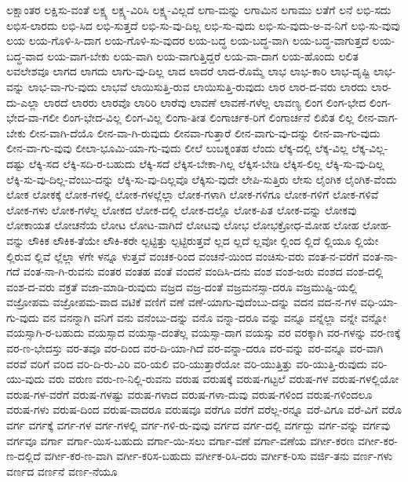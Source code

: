 {ಲಕ್ಷಾಂತರ
ಲಕ್ಷಿಸು-ವಂತೆ
ಲಕ್ಷ್ಯ
ಲಕ್ಷ್ಯ-ವಿರಿಸಿ
ಲಕ್ಷ್ಯ-ವಿಲ್ಲದೆ
ಲಗಾ-ಮನ್ನು
ಲಗಾಮಿನ
ಲಗಾಮು
ಲತೆಗೆ
ಲನೆ
ಲಭಿ-ಸದು
ಲಭಿಸ-ಲಾರದು
ಲಭಿ-ಸಿದ
ಲಭಿ-ಸುತ್ತದೆ
ಲಭಿ-ಸು-ವು-ದಿಲ್ಲ
ಲಭಿ-ಸು-ವುದು
ಲಭಿ-ಸು-ವುದು-ಅ-ವ-ನಿಗೆ
ಲಭಿ-ಸು-ವುವು
ಲಯ
ಲಯ-ಗೊಳಿ-ಸಿ-ದಾಗ
ಲಯ-ಗೊಳಿ-ಸು-ವುದರ
ಲಯ-ಬದ್ಧ
ಲಯ-ಬದ್ಧ-ವಾಗಿ
ಲಯ-ಬದ್ಧ-ವಾಗುತ್ತದೆ
ಲಯ-ಬದ್ಧ-ವಾದ
ಲಯ-ವಾಗ-ಬೇಕು
ಲಯ-ವಾಗಿ
ಲಯ-ವಾಗುತ್ತಿದ್ದರೆ
ಲಯ-ವಾ-ದಾಗ
ಲಯ-ಹೊಂದು
ಲಲಿತ
ಲವಲೇಶವೂ
ಲಾಗದ
ಲಾಗದು
ಲಾಗು-ವು-ದಿಲ್ಲ
ಲಾದ
ಲಾದರೆ
ಲಾದ-ರೊಮ್ಮೆ
ಲಾಭ
ಲಾಭ-ಕಾರಿ
ಲಾಭ-ದೃಷ್ಟಿ
ಲಾಭ-ವನ್ನು
ಲಾಭ-ವಾ-ಗು-ವುದು
ಲಾಭವೆ
ಲಾಯಿಸುತ್ತಿ-ರುವ
ಲಾಯಿಸುತ್ತಿ-ರುವುದು
ಲಾರ
ಲಾರ-ದ-ವರು
ಲಾರದು
ಲಾರ-ದು-ಎಲ್ಲಾ
ಲಾರದೆ
ಲಾರರು
ಲಾರವೊ
ಲಾರಿರಿ
ಲಾರೆವು
ಲಾವಣೆ
ಲಾವಣೆ-ಗಳೆಲ್ಲ
ಲಾವಣ್ಯ
ಲಿಂಗ
ಲಿಂಗ-ಭೇದ
ಲಿಂಗ-ಭೇದ-ವಾ-ಗಲೀ
ಲಿಂಗ-ಭೇದ-ವಿಲ್ಲ
ಲಿಂಗ-ವಿಲ್ಲ
ಲಿಂಗಾ-ತೀತ
ಲಿಂಗಾರ್ಚಕ-ರಿಗೆ
ಲಿಂಗಾರ್ಚನೆ
ಲಿಖಿತ
ಲಿಲ್ಲ
ಲೀನ-ವಾಗ-ಬೇಕು
ಲೀನ-ವಾಗಿ-ದೆಯೊ
ಲೀನ-ವಾ-ಗಿ-ರುವುದು
ಲೀನವಾ-ಗುತ್ತಾರೆ
ಲೀನ-ವಾಗು-ವು-ದನ್ನು
ಲೀನ-ವಾ-ಗು-ವುದು
ಲೀನ-ವಾ-ಗು-ವುವು
ಲೀಲಾ-ಭೂಮಿ-ಯಾ-ಗು-ವುದು
ಲೀಲೆ
ಲುಬಕ್ನಂತಹ
ಲೆಂದು
ಲೆಕ್ಕ-ದಲ್ಲಿ
ಲೆಕ್ಕ-ವಿಲ್ಲ
ಲೆಕ್ಕ-ವಿಲ್ಲ-ದಷ್ಟು
ಲೆಕ್ಕಿ-ಸದ
ಲೆಕ್ಕಿ-ಸದಿ-ರ-ಬಹುದು
ಲೆಕ್ಕಿ-ಸದೆ
ಲೆಕ್ಕಿಸ-ಬೇಕಾ-ಗಿಲ್ಲ
ಲೆಕ್ಕಿಸ-ಬೇಡಿ
ಲೆಕ್ಕಿಸ-ಲಿಲ್ಲ
ಲೆಕ್ಕಿ-ಸು-ವು-ದಿಲ್ಲ
ಲೆಕ್ಕಿ-ಸು-ವು-ದಿಲ್ಲ-ವೆಂಬು-ದನ್ನು
ಲೆಕ್ಕಿ-ಸು-ವು-ದಿಲ್ಲವೊ
ಲೆಕ್ಕಿಸು-ವುದೇ
ಲೇಪಿ-ಸುತ್ತಿರು
ಲೇಸು
ಲೈಂಗಿಕ
ಲೈಂಗಿಕ-ವೆಂದು
ಲೋಕ
ಲೋಕಕ್ಕೆ
ಲೋಕ-ಗಳಲ್ಲಿ
ಲೋಕ-ಗಳಲ್ಲೆಲ್ಲಾ
ಲೋಕ-ಗಳಾಗಿ
ಲೋಕ-ಗಳಿಗೂ
ಲೋಕ-ಗಳಿಗೆ
ಲೋಕ-ಗಳಿವೆ
ಲೋಕ-ಗಳು
ಲೋಕ-ಗಳೆಲ್ಲ
ಲೋಕದ
ಲೋಕ-ದಲ್ಲಿ
ಲೋಕ-ದಲ್ಲೊ
ಲೋಕ-ಪಿತ
ಲೋಕ-ವನ್ನು
ಲೋಕವು
ಲೋಕಾಯತ
ಲೋಚನೆಯ
ಲೋಟ
ಲೋಟ-ವಾಗಿದೆ
ಲೋಟವು
ಲೋಭ
ಲೋಭಕ್ರೋಧ-ಮೋಹ
ಲೋಹ
ಲೋಹ-ವನ್ನು
ಲೌಕಿಕ
ಲೌಕಿಕ-ತೆಯೇ
ಲೌಕಿ-ಕರೇ
ಲ್ಪಟ್ಟಿತ್ತು
ಲ್ಪಟ್ಟಿರುತ್ತವೆ
ಲ್ಲದ
ಲ್ಲದೆ
ಲ್ಲವೋ
ಲ್ಲಿಂದ
ಲ್ಲಿದೆ
ಲ್ಲಿಯೂ
ಲ್ಲಿಯೇ
ಲ್ಲಿರುವ
ಲ್ಲಿವೆ
ಲ್ಲೆಲ್ಲಾ
ಳಗೇ
ಳನ್ನೂ
ಳುತ್ತವೆ
ವಂಚಕ-ರಿಂದ
ವಂಚನೆ-ಯಿಂದ
ವಂಚಿಸು-ವರು
ವಂತ-ನ-ವರೆಗೆ
ವಂತ-ನಾ-ಗದೆ
ವಂತ-ನಾ-ಗಿ-ರುವನು
ವಂತರ
ವಂತಹ
ವಂತೆ
ವಂದನೆ
ವಂದಿಸಿ-ದನು
ವಂಶ
ವಂಶ-ಜರು
ವಂಶದ
ವಂಶ-ದಲ್ಲಿ
ವಂಶ-ದ-ವರು
ವಕ್ರತೆ
ವಜಾ-ಮಾಡಿ-ರುವುದು
ವಜ್ರದ
ವಜ್ರ-ದಂತೆ
ವಜ್ರಮನಸ್ಸಾ-ದರೂ
ವಜ್ರಮುಷ್ಟಿ-ಯಲ್ಲಿ
ವಜ್ರೋಪಮ
ವಜ್ರೋಪಮ-ವಾದ
ವಟಿಕೆ
ವಣಿಗೆ
ವಣೆ
ವಣೆ-ಯಾಗು-ವುದೆಂಬು-ದನ್ನು
ವದನ
ವದ-ನ-ಗಳ
ವಧಿ-ಯಾ-ಗು-ವುದು
ವನ
ವನನ್ನಾಗಿ
ವನಿಗೆ
ವನು
ವನೆಂಬು-ದನ್ನು
ವನೊ
ವನ್ನಾ-ದರೂ
ವನ್ನು
ವನ್ನೂ
ವನ್ನೆಲ್ಲಾ
ವನ್ನೇ
ವನ್ನೋ
ವಯಸ್ಸಾಗಿ-ರ-ಬಹುದು
ವಯಸ್ಸಾದ
ವಯಸ್ಸಾ-ದಂತೆಲ್ಲ
ವಯಸ್ಸಾ-ದಾಗ
ವಯಸ್ಸು
ವರ
ವರಕ್ಕಾಗಿ
ವರ-ಗಳನ್ನು
ವರ-ಣಕ್ಕೆ
ವರ-ಣ-ಭೇದಸ್ತು
ವರ-ತವೂ
ವರ-ದಿಂದ
ವರ-ದಿ-ಯಾ-ಗಿದೆ
ವರ-ವನ್ನಾ-ದರೂ
ವರ-ವನ್ನು
ವರ-ವನ್ನೂ
ವರ-ವಾಗಿ
ವರವೆ
ವರಿಗೆ
ವರಿದ
ವರಿ-ದಿ-ರು-ವಿರಿ
ವರಿ-ಯಲಿ
ವರಿ-ಯುತ್ತಾರೆಯೋ
ವರಿ-ಯುತ್ತಿತ್ತು
ವರಿ-ಯುತ್ತಿ-ರುವುದು
ವರಿ-ಯು-ವುದು
ವರು
ವರುಣ
ವರು-ಣ-ನಿಲ್ಲಿ-ರುವನು
ವರುಷ
ವರುಷಕ್ಕೆ
ವರುಷ-ಗಟ್ಟಲೆ
ವರುಷ-ಗಳ
ವರುಷ-ಗಳಲ್ಲಿಯೋ
ವರುಷ-ಗಳ-ವರೆಗೆ
ವರುಷ-ಗಳಷ್ಟು
ವರುಷ-ಗಳಾದ
ವರುಷ-ಗಳಾ-ದುವು
ವರುಷ-ಗಳಿಂದ
ವರುಷ-ಗಳಿಂದಲೂ
ವರುಷ-ಗಳು
ವರುಷ-ದಿಂದ
ವರುಷ-ವಾದರೂ
ವರುಷವೂ
ವರೆಗೂ
ವರೆಗೆ
ವರೆಲ್ಲ-ರನ್ನೂ
ವರೆ-ವಿಗೂ
ವರೆ-ವಿಗೆ
ವರೊ
ವರ್ಗ
ವರ್ಗಕ್ಕೆ
ವರ್ಗ-ಗಳ
ವರ್ಗ-ಗಳಲ್ಲಿ
ವರ್ಗ-ಗಳಿ-ರು-ವುವು
ವರ್ಗದ
ವರ್ಗ-ದಲ್ಲಿ
ವರ್ಗದ್ದು
ವರ್ಗ-ವನ್ನು
ವರ್ಗವು
ವರ್ಗವೂ
ವರ್ಗಾ
ವರ್ಗಾ-ಯಿಸ-ಬಹುದು
ವರ್ಗಾ-ಯಿ-ಸಲು
ವರ್ಗಾ-ವಣೆ
ವರ್ಗಾ-ವಣೆಯ
ವರ್ಗೀ-ಕರಣ
ವರ್ಗೀ-ಕರ-ಣ-ದಲ್ಲಿದೆ
ವರ್ಗೀ-ಕರ-ಣ-ವಾಗಿ
ವರ್ಗೀ-ಕರಿಸ-ಬಹುದು
ವರ್ಗೀಕ-ರಿಸಿ-ದರು
ವರ್ಗೀಕ-ರಿಸು
ವರ್ಜಿ-ತನು
ವರ್ಣ-ಗಳು
ವರ್ಣದ
ವರ್ಣನೆ
ವರ್ಣ-ನೆಯೂ
}
